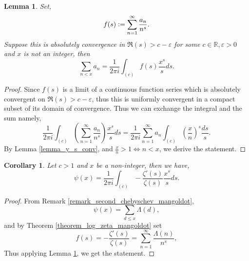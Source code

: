 \documentclass{article}
\newtheorem{lemma}{Lemma}[section]
\newtheorem{corollary}{Corollary} [section]
\newcommand{\defeq}{\vcentcolon=}
\newcommand{\R}[0]{\mathbb{R}}
\begin{document}
  \begin{lemma}
    Set,
    \begin{equation*}
      f(s)\defeq  \sum_{n=1}^\infty {\frac {a_n} {n^s}}.
    \end{equation*}
    Suppose this is absolutely convergence in $\Re(s)>c-\varepsilon$ for some $c\in\R,\varepsilon>0$ and $x$ is not an integer, then 
    \begin{equation*}
      \sum_{n<x}a_n = {\frac 1 {2\pi i}}\int_{(c)}f(s){\frac {x^s} s}ds.
    \end{equation*}
    \label{lemma_partial_sum_integration}
  \end{lemma}

  \begin{proof}
    Since $f(s)$ is a limit of a continuous function series which is absolutely convergent on $\Re(s)>c-\varepsilon$, thus this is uniformly convergent in a compact subset of its domain of convergence. Thus we can exchange the integral and the sum namely,
    \begin{equation*}
      {\frac 1 {2\pi i}}\int_{(c)}\left(\sum_{n=1}^\infty {\frac {a_n} {n^s}}\right){\frac {x^s}s}ds = {\frac 1 {2\pi i}}\sum_{n=1}^\infty a_n\int_{(c)}\left({\frac x n}\right)^s{\frac {ds} s}.
    \end{equation*}
    By Lemma \ref{lemma_y_s_conv}, and ${\frac x n}>1\Leftrightarrow n<x$, we derive the statement.
  \end{proof}

  \begin{corollary}
    Let $c>1$ and $x$ be a non-integer, then we have,
    \begin{equation*}
      \psi(x) = {\frac 1 {2\pi i}}\int_{(c)}-{\frac {\zeta'(s)} {\zeta(s)}}{\frac {x^s} s}ds.
    \end{equation*}
    \label{corollary_second_chebyschev_partial_sum}
  \end{corollary}

  \begin{proof}
    From Remark \ref{remark_second_chebyschev_mangoldot},
    \begin{equation*}
    \psi(x)=\sum_{d\leq x}\Lambda(d),
    \end{equation*}
    and by Theorem \ref{theorem_log_zeta_mangoldot} set
    \begin{equation*}
    f(s) = -{\frac {\zeta'(s)} {\zeta(s)}} = \sum_{n=1}^\infty {\frac {\Lambda(n)} {n^s}},
    \end{equation*}
    Thus applying Lemma \ref{lemma_partial_sum_integration}, we get the statement.
  \end{proof}
\end{document}
